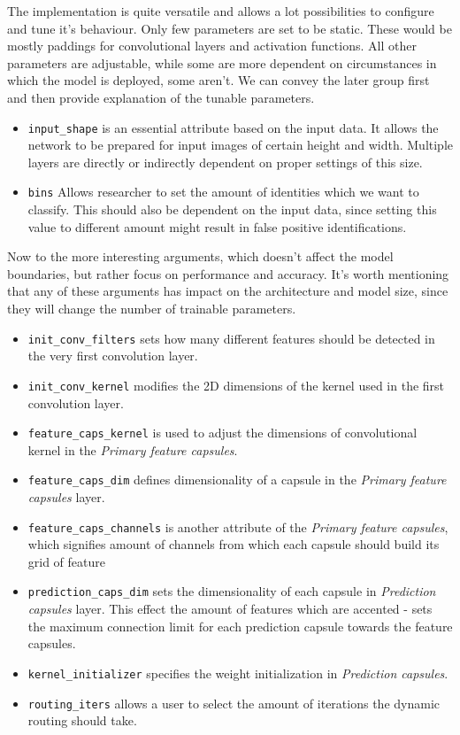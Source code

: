 The implementation is quite versatile and allows a lot possibilities to configure and tune it's behaviour. Only few parameters are set to be static. These would be mostly paddings for convolutional layers and activation functions. All other parameters are adjustable, while some are more dependent on circumstances in which the model is deployed, some aren't. We can convey the later group first and then provide explanation of the tunable parameters.

\begin{itemize}
    \item \texttt{input\_shape} is an essential attribute based on the input data. It allows the network to be prepared for input images of certain height and width. Multiple layers are directly or indirectly dependent on proper settings of this size.
    \item \texttt{bins} Allows researcher to set the amount of identities which we want to classify. This should also be dependent on the input data, since setting this value to different amount might result in false positive identifications.
\end{itemize}

Now to the more interesting arguments, which doesn't affect the model boundaries, but rather focus on performance and accuracy. It's worth mentioning that any of these arguments has impact on the architecture and model size, since they will change the number of trainable parameters.

\begin{itemize}
    \item \texttt{init\_conv\_filters} sets how many different features should be detected in the very first convolution layer.
    \item \texttt{init\_conv\_kernel} modifies the 2D dimensions of the kernel used in the first convolution layer.
    \item \texttt{feature\_caps\_kernel} is used to adjust the dimensions of convolutional kernel in the \textit{Primary feature capsules}.
    \item \texttt{feature\_caps\_dim} defines dimensionality of a capsule in the \textit{Primary feature capsules} layer.
    \item \texttt{feature\_caps\_channels} is another attribute of the \textit{Primary feature capsules}, which signifies amount of channels from which each capsule should build its grid of feature
    \item \texttt{prediction\_caps\_dim} sets the dimensionality of each capsule in \textit{Prediction capsules} layer. This effect the amount of features which are accented - sets the maximum connection limit for each prediction capsule towards the feature capsules.
    \item \texttt{kernel\_initializer} specifies the weight initialization in \textit{Prediction capsules}.
    \item \texttt{routing\_iters} allows a user to select the amount of iterations the dynamic routing should take.
\end{itemize}

